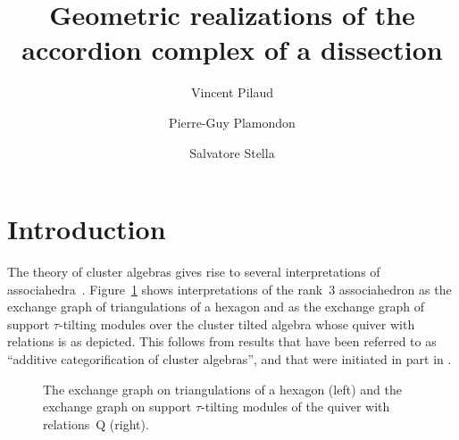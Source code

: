 \documentclass{amsart}
\title[Geometric realizations of the accordion complex of a dissection]{Geometric realizations of the \\ accordion complex of a dissection}
\author{Vincent Pilaud}
\author{Pierre-Guy Plamondon}
\author{Salvatore Stella}
\theoremstyle{definition}
\renewcommand{\b}[1]{\mathbf{#1}} %
\newcommand{\fref}[1]{Figure~\ref{#1}} %
\newcommand{\dissection}{\mathrm{D}} %
\newcommand{\quiver}{\mathrm{Q}} %
\begin{document}
\begin{abstract}
%
\end{abstract}


\maketitle{}


\section{Introduction}

The theory of cluster algebras gives rise to several interpretations of associahedra~\mbox{\cite{Tamari, Stasheff}}. \fref{fig:associahedron} shows interpretations of the rank~$3$ associahedron as the exchange graph of triangulations of a hexagon and as the exchange graph of support $\tau$-tilting modules over the cluster tilted algebra whose quiver with relations is as depicted. 
This follows from results that have been referred to as ``additive categorification of cluster algebras'', and that were initiated in part in \cite{CalderoChapotonSchiffler, BuanMarshReinekeReitenTodorov}.

\begin{figure}
	\capstart
	\centerline{\associahedronAccordionTikz{}\associahedronSiltingTikz{}}
	\caption{The exchange graph on triangulations of a hexagon (left) and the exchange graph on support $\tau$-tilting modules of the quiver with relations~$\quiver$ (right).}
	\label{fig:associahedron}
\end{figure}
\end{document}
